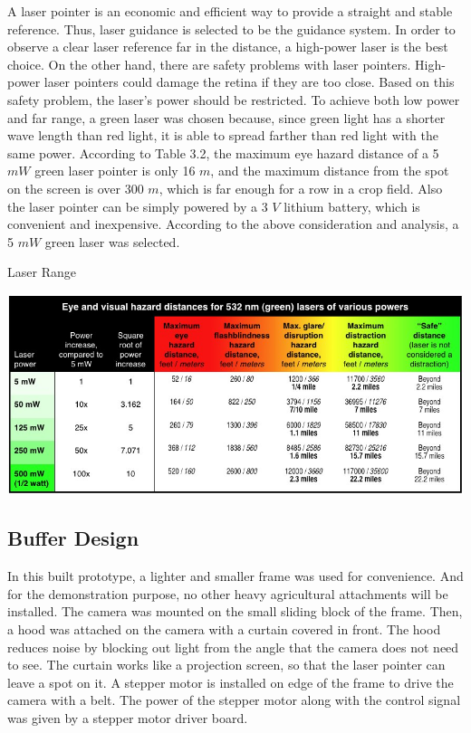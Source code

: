 A laser pointer is an economic and efficient way to provide a straight and stable reference. Thus, laser guidance is selected to be the guidance system. In order to observe a clear laser reference far in the distance, a high-power laser is the best choice. On the other hand, there are safety problems with laser pointers. High-power laser pointers could damage the retina if they are too close. Based on this safety problem, the laser's power should be restricted. To achieve both low power and far range, a green laser was chosen because, since green light has a shorter wave length than red light, it is able to spread farther than red light with the same power. According to Table 3.2, the maximum eye hazard distance of a 5 $mW$ green laser pointer is only 16 $m$, and the maximum distance from the spot on the screen is over 300 $m$, which is far enough for a row in a crop field. Also the laser pointer can be simply powered by a 3 $V$ lithium battery, which is convenient and inexpensive. According to the above consideration and analysis, a 5 $mW$ green laser was selected.
\begin{table}[ht!]
\begin{center}
\caption{Laser Range}
\includegraphics[scale = 0.5]{pics/laserrange.jpg}
\end{center}
\end{table}

\subsection{Buffer Design}


In this built prototype, a lighter and smaller frame was used for convenience. And for the demonstration purpose, no other heavy agricultural attachments will be installed. The camera was mounted on the small sliding block of the frame. Then, a hood was attached on the camera with a curtain covered in front. The hood reduces noise by blocking out light from the angle that the camera does not need to see. The curtain works like a projection screen, so that the laser pointer can leave a spot on it.  A stepper motor is installed on edge of the frame to drive the camera with a belt. The power of the stepper motor along with the control signal was given by a stepper motor driver board. 

